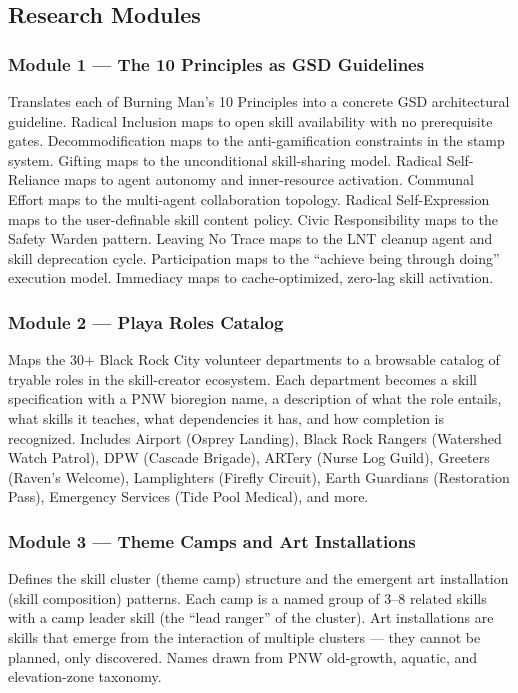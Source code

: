 \documentclass[11pt,letterpaper]{article}
\begin{document}
\subsection{Research Modules}

\subsubsection{Module 1 --- The 10 Principles as GSD Guidelines}
Translates each of Burning Man's 10 Principles into a concrete GSD architectural guideline. Radical Inclusion maps to open skill availability with no prerequisite gates. Decommodification maps to the anti-gamification constraints in the stamp system. Gifting maps to the unconditional skill-sharing model. Radical Self-Reliance maps to agent autonomy and inner-resource activation. Communal Effort maps to the multi-agent collaboration topology. Radical Self-Expression maps to the user-definable skill content policy. Civic Responsibility maps to the Safety Warden pattern. Leaving No Trace maps to the LNT cleanup agent and skill deprecation cycle. Participation maps to the ``achieve being through doing'' execution model. Immediacy maps to cache-optimized, zero-lag skill activation.

\subsubsection{Module 2 --- Playa Roles Catalog}
Maps the 30+ Black Rock City volunteer departments to a browsable catalog of tryable roles in the skill-creator ecosystem. Each department becomes a skill specification with a PNW bioregion name, a description of what the role entails, what skills it teaches, what dependencies it has, and how completion is recognized. Includes Airport (Osprey Landing), Black Rock Rangers (Watershed Watch Patrol), DPW (Cascade Brigade), ARTery (Nurse Log Guild), Greeters (Raven's Welcome), Lamplighters (Firefly Circuit), Earth Guardians (Restoration Pass), Emergency Services (Tide Pool Medical), and more.

\subsubsection{Module 3 --- Theme Camps and Art Installations}
Defines the skill cluster (theme camp) structure and the emergent art installation (skill composition) patterns. Each camp is a named group of 3--8 related skills with a camp leader skill (the ``lead ranger'' of the cluster). Art installations are skills that emerge from the interaction of multiple clusters --- they cannot be planned, only discovered. Names drawn from PNW old-growth, aquatic, and elevation-zone taxonomy.
\end{document}
